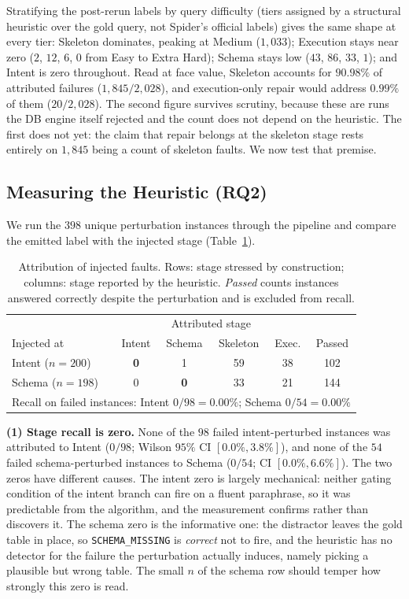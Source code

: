\documentclass{llncs}
\begin{document}
Stratifying the post-rerun labels by query difficulty (tiers assigned by a
structural heuristic over the gold query, not Spider's official labels) gives
the same shape at every tier: Skeleton dominates, peaking at Medium
($1{,}033$); Execution stays near zero ($2$, $12$, $6$, $0$ from Easy to Extra
Hard); Schema stays low ($43$, $86$, $33$, $1$); and Intent is zero throughout.
Read at face value, Skeleton accounts for $90.98\%$ of attributed failures
($1{,}845/2{,}028$), and execution-only repair would address $0.99\%$ of them
($20/2{,}028$). The second figure survives scrutiny, because these are runs
the DB engine itself rejected and the count does not depend on the heuristic.
The first does not yet: the claim that repair belongs at the skeleton stage
rests entirely on $1{,}845$ being a count of skeleton faults. We now test that
premise.

\subsection{Measuring the Heuristic (RQ2)}
\label{sec:bias_results}

We run the $398$ unique perturbation instances through the pipeline and
compare the emitted label with the injected stage (Table~\ref{tab:confusion}).

\begin{table}[t]
\centering
\caption{Attribution of injected faults. Rows: stage stressed by construction;
columns: stage reported by the heuristic. \emph{Passed} counts instances
answered correctly despite the perturbation and is excluded from recall.}
\label{tab:confusion}
\small
\begin{tabular}{lccccc}
\toprule
& \multicolumn{4}{c}{Attributed stage} & \\
Injected at & Intent & Schema & Skeleton & Exec. & Passed \\
\midrule
Intent ($n{=}200$) & \textbf{0} & 1 & 59 & 38 & 102 \\
Schema ($n{=}198$) & 0 & \textbf{0} & 33 & 21 & 144 \\
\midrule
\multicolumn{6}{l}{Recall on failed instances: Intent $0/98=\mathbf{0.00\%}$;
Schema $0/54=\mathbf{0.00\%}$} \\
\bottomrule
\end{tabular}
\end{table}

\noindent\textbf{(1) Stage recall is zero.} None of the $98$ failed
intent-perturbed instances was attributed to Intent ($0/98$; Wilson $95\%$ CI
$[0.0\%,3.8\%]$), and none of the $54$ failed schema-perturbed instances to
Schema ($0/54$; CI $[0.0\%,6.6\%]$). The two zeros have different causes. The
intent zero is largely mechanical: neither gating condition of the intent
branch can fire on a fluent paraphrase, so it was predictable from the
algorithm, and the measurement confirms rather than discovers it. The schema
zero is the informative one: the distractor leaves the gold table in place,
so \texttt{SCHEMA\_MISSING} is \emph{correct} not to fire, and the heuristic has
no detector for the failure the perturbation actually induces, namely picking
a plausible but wrong table. The small $n$ of the schema row should temper how
strongly this zero is read.
\end{document}
